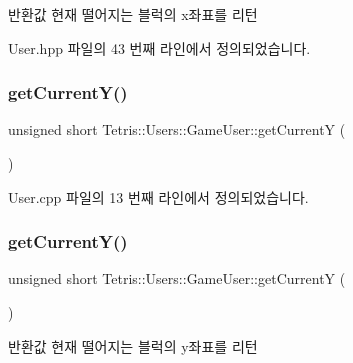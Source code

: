 \begin{DoxyReturn}{반환값}
현재 떨어지는 블럭의 x좌표를 리턴 
\end{DoxyReturn}


User.\+hpp 파일의 43 번째 라인에서 정의되었습니다.

\mbox{\label{class_tetris_1_1_users_1_1_game_user_af5bd7ff0b575af1b42b093488cff97e2}} 
\subsubsection{\texorpdfstring{get\+Current\+Y()}{getCurrentY()}\hspace{0.1cm}{\footnotesize\ttfamily [1/2]}}
{\footnotesize\ttfamily unsigned short Tetris\+::\+Users\+::\+Game\+User\+::get\+CurrentY (\begin{DoxyParamCaption}{ }\end{DoxyParamCaption})}



User.\+cpp 파일의 13 번째 라인에서 정의되었습니다.

\mbox{\label{class_tetris_1_1_users_1_1_game_user_af5bd7ff0b575af1b42b093488cff97e2}} 
\subsubsection{\texorpdfstring{get\+Current\+Y()}{getCurrentY()}\hspace{0.1cm}{\footnotesize\ttfamily [2/2]}}
{\footnotesize\ttfamily unsigned short Tetris\+::\+Users\+::\+Game\+User\+::get\+CurrentY (\begin{DoxyParamCaption}{ }\end{DoxyParamCaption})\hspace{0.3cm}{\ttfamily [inline]}}

\begin{DoxyReturn}{반환값}
현재 떨어지는 블럭의 y좌표를 리턴 
\end{DoxyReturn}


